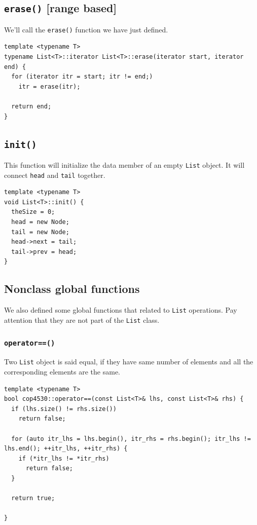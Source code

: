 \documentclass[12pt]{book}
\begin{document}
\subsection{\texttt{erase()} [range based]}
\label{sec:org23806f8}
We'll call the \texttt{erase()} function we have just defined.
\begin{verbatim}
template <typename T>
typename List<T>::iterator List<T>::erase(iterator start, iterator end) {
  for (iterator itr = start; itr != end;)
    itr = erase(itr);

  return end;
}
\end{verbatim}
\subsection{\texttt{init()}}
\label{sec:orgdb52c76}
This function will initialize the data member of an empty \texttt{List} object. It will connect \texttt{head} and \texttt{tail} together.
\begin{verbatim}
template <typename T>
void List<T>::init() {
  theSize = 0;
  head = new Node;
  tail = new Node;
  head->next = tail;
  tail->prev = head;
}
\end{verbatim}
\subsection{Nonclass global functions}
\label{sec:orgbbbbfbc}
We also defined some global functions that related to \texttt{List} operations. Pay attention that they are not part of the \texttt{List} class. 
\subsubsection{\texttt{operator==()}}
\label{sec:org8804392}
Two \texttt{List} object is said equal, if they have same number of elements and all the corresponding elements are the same.
\begin{verbatim}
template <typename T>
bool cop4530::operator==(const List<T>& lhs, const List<T>& rhs) {
  if (lhs.size() != rhs.size())
    return false;

  for (auto itr_lhs = lhs.begin(), itr_rhs = rhs.begin(); itr_lhs != lhs.end(); ++itr_lhs, ++itr_rhs) {
    if (*itr_lhs != *itr_rhs)
      return false;
  }

  return true;

}
\end{verbatim}
\end{document}
